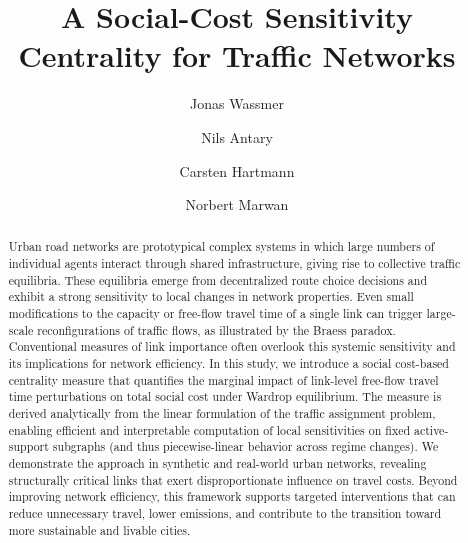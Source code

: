 \documentclass[twocolumn,english,groupedaddress, superscriptaddress,aps,pre,10pt,floatfix]{revtex4-2}
\begin{document}
\title{A Social-Cost Sensitivity Centrality for Traffic Networks}

\author{Jonas Wassmer}
\author{Nils Antary}
\author{Carsten Hartmann}
\author{Norbert Marwan}


\begin{abstract}
Urban road networks are prototypical complex systems in which large numbers of individual agents interact through shared infrastructure, giving rise to collective traffic equilibria. These equilibria emerge from decentralized route choice decisions and exhibit a strong sensitivity to local changes in network properties. Even small modifications to the capacity or free-flow travel time of a single link can trigger large-scale reconfigurations of traffic flows, as illustrated by the Braess paradox. Conventional measures of link importance often overlook this systemic sensitivity and its implications for network efficiency. In this study, we introduce a social cost-based centrality measure that quantifies the marginal impact of link-level free-flow travel time perturbations on total social cost under Wardrop equilibrium. The measure is derived analytically from the linear formulation of the traffic assignment problem, enabling efficient and interpretable computation of local sensitivities on fixed active-support subgraphs (and thus piecewise-linear behavior across regime changes). We demonstrate the approach in synthetic and real-world urban networks, revealing structurally critical links that exert disproportionate influence on travel costs. Beyond improving network efficiency, this framework supports targeted interventions that can reduce unnecessary travel, lower emissions, and contribute to the transition toward more sustainable and livable cities.
\end{abstract}
\end{document}
